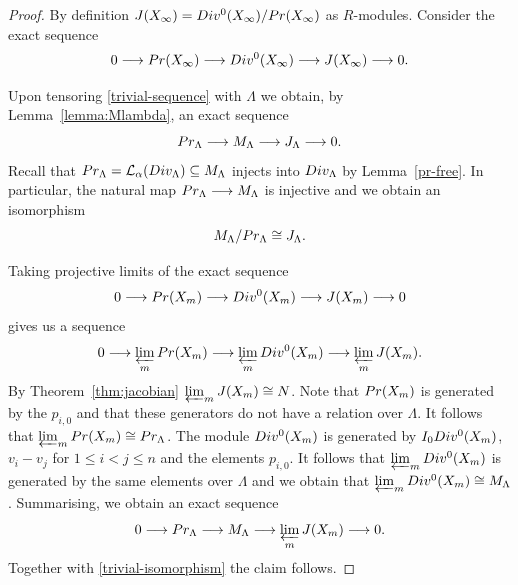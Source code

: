 \documentclass[11pt]{article}
\theoremstyle{definition}
\numberwithin{equation}{section}
\begin{document}
\begin{proof}
	By definition $J(X_\infty)=\textup{Div}^0(X_\infty)/\textup{Pr}(X_\infty)$ as $R$-modules. Consider the exact sequence
	\begin{equation}\label{trivial-sequence}0\longrightarrow \textup{Pr}(X_\infty)\longrightarrow \textup{Div}^0(X_\infty)\longrightarrow J(X_\infty)\longrightarrow 0.\end{equation}
	
	
	Upon tensoring \eqref{trivial-sequence} with $\Lambda$ we obtain, by Lemma~\ref{lemma:Mlambda}, an exact sequence
	\[\textup{Pr}_\Lambda\longrightarrow M_\Lambda\longrightarrow J_\Lambda \longrightarrow 0.\]
	Recall that $\textup{Pr}_\Lambda=\mathcal{L}_\alpha(\textup{Div}_\Lambda)\subseteq M_\Lambda$ injects into $\textup{Div}_ \Lambda$ by Lemma~\ref{pr-free}. In particular, the natural map $\textup{Pr}_\Lambda\longrightarrow M_\Lambda$ is injective and we obtain an isomorphism
	\begin{equation}
		\label{trivial-isomorphism}
		M_\Lambda/\textup{Pr}_\Lambda \cong J_\Lambda.
	\end{equation}
	
	Taking projective limits of the exact sequence
	\[0\longrightarrow \textup{Pr}(X_m)\longrightarrow \textup{Div}^0(X_m)\longrightarrow J(X_m)\longrightarrow 0\] gives us a sequence
	\[0\longrightarrow \varprojlim_m\textup{Pr}(X_m)\longrightarrow \varprojlim_m\textup{Div}^0(X_m)\longrightarrow \varprojlim_mJ(X_m).\]
	By Theorem~\ref{thm:jacobian} $\varprojlim_mJ(X_m)\cong N$. Note that $\textup{Pr}(X_m)$ is generated by the $p_{i,0}$ and that these generators do not have a relation over $\Lambda$. It follows that $\varprojlim_m\textup{Pr}(X_m)\cong \textup{Pr}_\Lambda$. The module $\textup{Div}^0(X_m)$ is generated by $I_0\textup{Div}^0(X_m)$, $v_i-v_{j}$ for $1\le i<j\le n$ and the elements $p_{i,0}$. It follows that $\varprojlim_m\textup{Div}^0(X_m)$ is generated by the same elements over $\Lambda$ and we obtain that $\varprojlim_m\textup{Div}^0(X_m)\cong M_\Lambda$. Summarising, we obtain an exact sequence
	\[0\longrightarrow \textup{Pr}_\Lambda\longrightarrow M_\Lambda\longrightarrow \varprojlim_mJ(X_m)\longrightarrow 0. \]
	Together with \eqref{trivial-isomorphism} the claim follows.
\end{proof}
\end{document}
